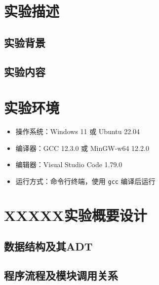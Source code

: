 \documentclass[12pt,hyperref,a4paper,UTF8]{ctexart}
\begin{document}
\cover

%
%

\thispagestyle{empty} %

\newpage
\tableofcontents

\newpage

\section{实验描述}
\subsection{实验背景}
\subsection{实验内容}

\section{实验环境}
\begin{itemize}
    \item 操作系统：Windows 11 或 Ubuntu 22.04
    \item 编译器：GCC 12.3.0 或 MinGW-w64 12.2.0
    \item 编辑器：Visual Studio Code 1.79.0
    \item 运行方式：命令行终端，使用 \texttt{gcc} 编译后运行
\end{itemize}

\section{XXXXX实验概要设计}
\subsection{数据结构及其ADT}
\subsection{程序流程及模块调用关系}
\end{document}
